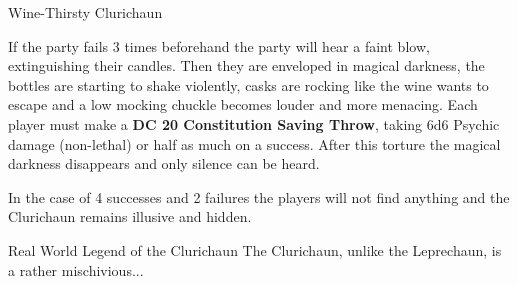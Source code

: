 \begin{DndQuestHook}[width=0.5\textwidth - 4pt]{Wine-Thirsty Clurichaun}
{	If the party fails 3 times beforehand the party will hear a faint blow, extinguishing their candles. Then they are enveloped in magical darkness, the bottles are starting to shake violently, casks are rocking like the wine wants to escape and a low mocking chuckle becomes louder and more menacing. Each player must make a \textbf{DC 20 Constitution Saving Throw}, taking 6d6 Psychic damage (non-lethal) or half as much on a success. After this torture the magical darkness disappears and only silence can be heard.
	
	In the case of 4 successes and 2 failures the players will not find anything and the Clurichaun remains illusive and hidden.
	}
	
\end{DndQuestHook}
\begin{DndComment}[color=DmgCoral]{Real World Legend of the Clurichaun}
	The Clurichaun, unlike the Leprechaun, is a rather mischivious...
\end{DndComment}
